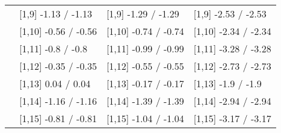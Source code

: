\begin{table}
\begin{tabular}[t]{llll}
 & {}[1,9] -1.13  / -1.13 & {}[1,9] -1.29  / -1.29 & {}[1,9] -2.53  / -2.53\\
 & {}[1,10] -0.56  / -0.56 & {}[1,10] -0.74  / -0.74 & {}[1,10] -2.34  / -2.34\\
 & {}[1,11] -0.8  / -0.8 & {}[1,11] -0.99  / -0.99 & {}[1,11] -3.28  / -3.28\\
 & {}[1,12] -0.35  / -0.35 & {}[1,12] -0.55  / -0.55 & {}[1,12] -2.73  / -2.73\\
\addlinespace
 & {}[1,13] 0.04  / 0.04 & {}[1,13] -0.17  / -0.17 & {}[1,13] -1.9  / -1.9\\
 & {}[1,14] -1.16  / -1.16 & {}[1,14] -1.39  / -1.39 & {}[1,14] -2.94  / -2.94\\
 & {}[1,15] -0.81  / -0.81 & {}[1,15] -1.04  / -1.04 & {}[1,15] -3.17  / -3.17\\
\bottomrule
\end{tabular}
\end{table}
